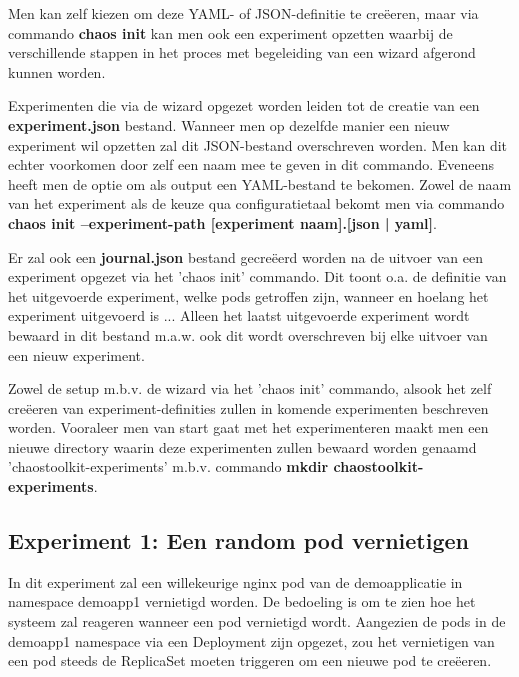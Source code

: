 Men kan zelf kiezen om deze YAML- of JSON-definitie te creëeren, maar via commando {\bf chaos init} kan men ook een experiment opzetten waarbij de verschillende stappen in het proces met begeleiding van een wizard afgerond kunnen worden. 

Experimenten die via de wizard opgezet worden leiden tot de creatie van een {\bf experiment.json} bestand. Wanneer men op dezelfde manier een nieuw experiment wil opzetten zal dit JSON-bestand overschreven worden. Men kan dit echter voorkomen door zelf een naam mee te geven in dit commando. Eveneens heeft men de optie om als output een YAML-bestand te bekomen. Zowel de naam van het experiment als de keuze qua configuratietaal bekomt men via commando {\bf chaos init --experiment-path [experiment naam].[json | yaml]}.

Er zal ook een {\bf journal.json} bestand gecreëerd worden na de uitvoer van een experiment opgezet via het 'chaos init' commando. Dit toont o.a. de definitie van het uitgevoerde experiment, welke pods getroffen zijn, wanneer en hoelang het experiment uitgevoerd is ...
Alleen het laatst uitgevoerde experiment wordt bewaard in dit bestand m.a.w. ook dit wordt overschreven bij elke uitvoer van een nieuw experiment.   

Zowel de setup m.b.v. de wizard via het 'chaos init' commando, alsook het zelf creëeren van experiment-definities zullen in komende experimenten beschreven worden. Vooraleer men van start gaat met het experimenteren maakt men een nieuwe directory waarin deze experimenten zullen bewaard worden genaamd 'chaostoolkit-experiments' m.b.v. commando {\bf mkdir chaostoolkit-experiments}. 

\subsection{Experiment 1: Een random pod vernietigen}

In dit experiment zal een willekeurige nginx pod van de demoapplicatie in namespace demoapp1 vernietigd worden. De bedoeling is om te zien hoe het systeem zal reageren wanneer een pod vernietigd wordt. Aangezien de pods in de demoapp1 namespace via een Deployment zijn opgezet, zou het vernietigen van een pod steeds de ReplicaSet moeten triggeren om een nieuwe pod te creëeren.

